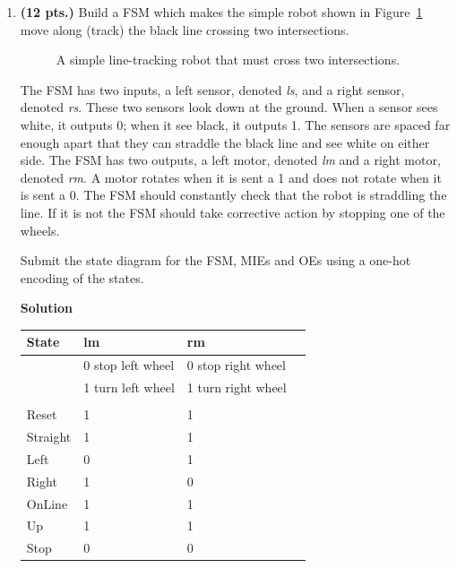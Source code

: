 \begin{enumerate}
\begin{onlysolution}
{}\end{onlysolution} 

\item \textbf{ (12 pts.)}
\label{item:robot}
Build a FSM which makes the simple robot shown in Figure~\ref{fig:Robot}
move along (track) the black line crossing two intersections.
\begin{figure}[ht]
\caption{A simple line-tracking robot that must cross two intersections.}
\label{fig:Robot}
\end{figure}

The FSM has two inputs, a left sensor, denoted \textit{ ls}, and a right 
sensor, denoted \textit{ rs}.  These two sensors look down at the ground.  
When a sensor sees white, it outputs 0; when it see black, it outputs 1.  
The sensors are spaced far enough apart that they can straddle the black 
line and see white on either side.  The FSM has two outputs, a left
motor, denoted \textit{ lm} and a right motor, denoted \textit{ rm}.  A motor
rotates when it is sent a 1 and does not rotate when it is sent a 0.
The FSM should constantly check that the robot is straddling the line.
If it is not the FSM should take corrective action by stopping one of
the wheels.

Submit the state diagram for the FSM,  MIEs and OEs using 
a one-hot encoding of the states.

\begin{onlysolution}  \textbf{Solution} \itshape{
\begin{figure}[ht]
\end{figure}

\begin{tabular}{l|l|l|l}
State & lm		  & rm			\\ \hline
      & 0 stop left wheel & 0 stop right wheel  \\ \hline
      & 1 turn left wheel & 1 turn right wheel  \\ \hline
      &                   &                     \\ \hline \hline
Reset	 & 1		  & 1			\\ \hline
Straight & 1		  & 1			\\ \hline
Left     & 0		  & 1			\\ \hline
Right    & 1		  & 0			\\ \hline
OnLine   & 1		  & 1			\\ \hline
Up	 & 1		  & 1			\\ \hline
Stop	 & 0		  & 0			\\ 
\end{tabular}
} \end{onlysolution}  


\end{enumerate}
